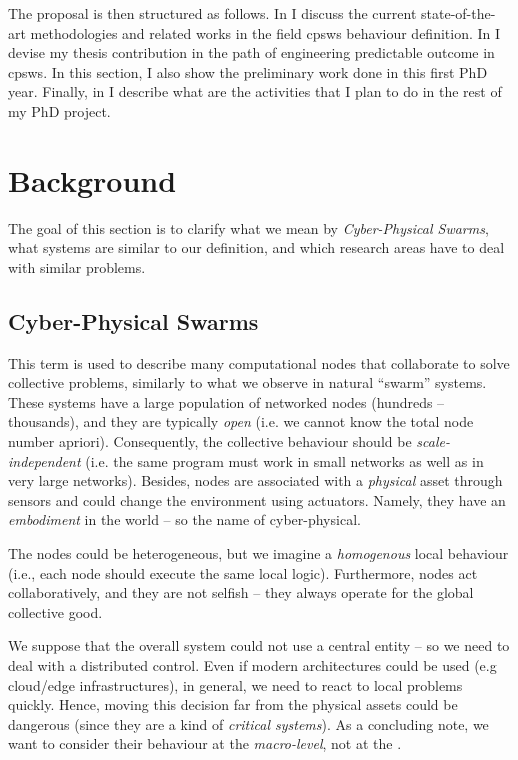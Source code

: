 \documentclass[11pt]{article}
\begin{document}
The proposal is then structured as follows. In  I discuss the current state-of-the-art methodologies and related works in the field \acp{cpsw} behaviour definition.
%
In  I devise my thesis contribution in the path of engineering predictable outcome in \acp{cpsw}. 
%
In this section, I also show the preliminary work done in this first PhD year.
%
Finally, in  I describe what are the activities that I plan to do in the rest of my PhD project.

\section{Background} \label{background}
The goal of this section is to clarify what we mean by \textit{Cyber-Physical Swarms}, what systems are similar to our definition, and which research areas have to deal with similar problems.
\subsection{Cyber-Physical Swarms}
This term is used to describe many computational nodes that collaborate to solve collective problems, similarly to what we observe in natural ``swarm'' systems.
%
These systems have a large population of networked nodes (hundreds -- thousands), and they are typically \textit{open} (i.e. we cannot know the total node number apriori). 
%
Consequently, the collective behaviour should be \textit{scale-independent} (i.e. the same program must work in small networks as well as in very large networks).
%
Besides, nodes are associated with a \textit{physical} asset through sensors and could change the environment using actuators. 
%
Namely, they have an \emph{embodiment} in the world -- so the name of cyber-physical. 

The nodes could be heterogeneous, but we imagine a \emph{homogenous} local behaviour (i.e., each node should execute the same local logic). 
%
Furthermore, nodes act collaboratively, and they are not selfish -- they always operate for the global collective good.

We suppose that the overall system could not use a central entity -- so we need to deal with a distributed control. 
%
Even if modern architectures could be used (e.g cloud/edge infrastructures), in general, we need to react to local problems quickly. 
%
Hence, moving this decision far from the physical assets could be dangerous (since they are a kind of \emph{critical systems}).
%
As a concluding note, we want to consider their behaviour at the \textit{macro-level}, not at the . 
\end{document}
